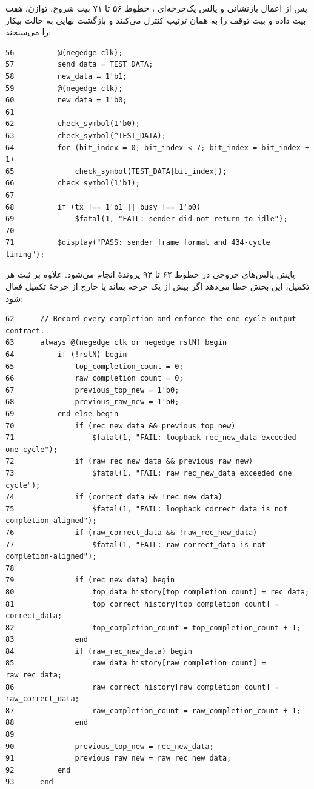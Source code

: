 پس از اعمال بازنشانی و پالس یک‌چرخه‌ای ، خطوط ۵۶ تا ۷۱ بیت شروع، توازن،
هفت بیت داده و بیت توقف را به همان ترتیب کنترل می‌کنند و بازگشت نهایی به حالت بیکار را
می‌سنجند:

\begin{dsdlcodeblock}
\begin{verbatim}
56          @(negedge clk);
57          send_data = TEST_DATA;
58          new_data = 1'b1;
59          @(negedge clk);
60          new_data = 1'b0;
61
62          check_symbol(1'b0);
63          check_symbol(^TEST_DATA);
64          for (bit_index = 0; bit_index < 7; bit_index = bit_index + 1)
65              check_symbol(TEST_DATA[bit_index]);
66          check_symbol(1'b1);
67
68          if (tx !== 1'b1 || busy !== 1'b0)
69              $fatal(1, "FAIL: sender did not return to idle");
70
71          $display("PASS: sender frame format and 434-cycle timing");
\end{verbatim}
\end{dsdlcodeblock}

پایش پالس‌های خروجی در خطوط ۶۲ تا ۹۳ پروندهٔ  انجام می‌شود. علاوه بر ثبت
هر تکمیل، این بخش خطا می‌دهد اگر  بیش از یک چرخه بماند یا
 خارج از چرخهٔ تکمیل فعال شود:

\begin{dsdlcodeblock}
\begin{verbatim}
62      // Record every completion and enforce the one-cycle output contract.
63      always @(negedge clk or negedge rstN) begin
64          if (!rstN) begin
65              top_completion_count = 0;
66              raw_completion_count = 0;
67              previous_top_new = 1'b0;
68              previous_raw_new = 1'b0;
69          end else begin
70              if (rec_new_data && previous_top_new)
71                  $fatal(1, "FAIL: loopback rec_new_data exceeded one cycle");
72              if (raw_rec_new_data && previous_raw_new)
73                  $fatal(1, "FAIL: raw rec_new_data exceeded one cycle");
74              if (correct_data && !rec_new_data)
75                  $fatal(1, "FAIL: loopback correct_data is not completion-aligned");
76              if (raw_correct_data && !raw_rec_new_data)
77                  $fatal(1, "FAIL: raw correct_data is not completion-aligned");
78
79              if (rec_new_data) begin
80                  top_data_history[top_completion_count] = rec_data;
81                  top_correct_history[top_completion_count] = correct_data;
82                  top_completion_count = top_completion_count + 1;
83              end
84              if (raw_rec_new_data) begin
85                  raw_data_history[raw_completion_count] = raw_rec_data;
86                  raw_correct_history[raw_completion_count] = raw_correct_data;
87                  raw_completion_count = raw_completion_count + 1;
88              end
89
90              previous_top_new = rec_new_data;
91              previous_raw_new = raw_rec_new_data;
92          end
93      end
\end{verbatim}
\end{dsdlcodeblock}

